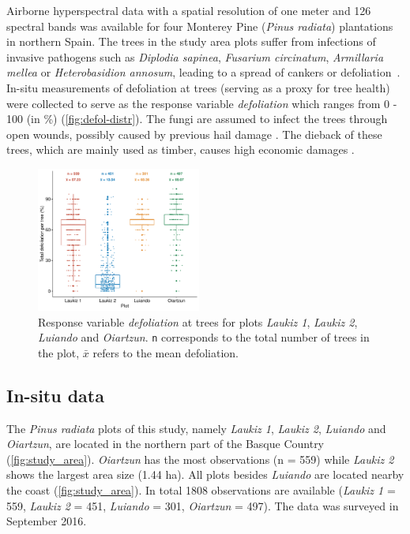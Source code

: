 \documentclass[letterpaper, peerreview]{IEEEtran}
\begin{document}
\noindent Airborne hyperspectral data with a spatial resolution of one meter and 126 spectral bands was available for four Monterey Pine (\textit{Pinus radiata}) plantations in northern Spain.
The trees in the study area plots suffer from infections of invasive pathogens such as \textit{Diplodia sapinea}, \textit{Fusarium circinatum}, \textit{Armillaria mellea} or \textit{Heterobasidion annosum}, leading to a spread of cankers or defoliation~\cite{mesanza2016, iturritxa2017}.
In-situ measurements of defoliation at trees (serving as a proxy for tree health) were collected to serve as the response variable \textit{defoliation} which ranges from 0 - 100 (in \%) (\autoref{fig:defol-distr}).
The fungi are assumed to infect the trees through open wounds, possibly caused by previous hail damage \cite{iturritxa2014}.
The dieback of these trees, which are mainly used as timber, causes high economic damages \cite{ganley2009}.

\begin{figure} [t!]
	\centering
	\begin{center}
		\includegraphics[width=0.48\textwidth] {defoliation-distribution-plot-1.pdf}
		\caption{Response variable \textit{defoliation} at trees for plots \textit{Laukiz 1}, \textit{Laukiz 2}, \textit{Luiando} and \textit{Oiartzun}. \texttt{n} corresponds to the total number of trees in the plot, $\bar{x}$ refers to the mean defoliation.}\label{fig:defol-distr}
	\end{center}
\end{figure}

\subsection{In-situ data}

\noindent The \textit{Pinus radiata} plots of this study, namely \textit{Laukiz 1}, \textit{Laukiz 2}, \textit{Luiando} and \textit{Oiartzun}, are located in the northern part of the Basque Country (\autoref{fig:study_area}).
\textit{Oiartzun} has the most observations (n = 559) while \textit{Laukiz 2} shows the largest area size (1.44 ha).
All plots besides \textit{Luiando} are located nearby the coast (\autoref{fig:study_area}).
In total 1808 observations are available (\textit{Laukiz 1} = 559, \textit{Laukiz 2} = 451, \textit{Luiando} = 301, \textit{Oiartzun} = 497).
The data was surveyed in September 2016.
\end{document}
